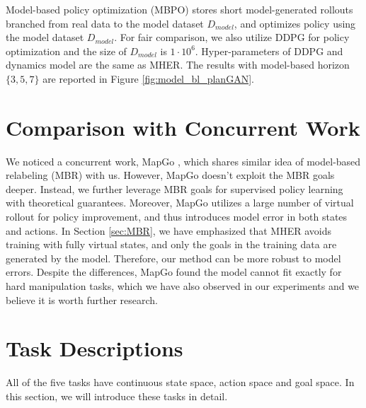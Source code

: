 \documentclass{article}
\begin{document}
Model-based policy optimization (MBPO) \cite{DBLP:conf/nips/JannerFZL19} stores short model-generated rollouts branched from real data to the model dataset $D_{model}$, and optimizes policy using the model dataset $D_{model}$. For fair comparison, we also utilize DDPG for policy optimization and the size of $D_{model}$ is $1\cdot 10^6$. Hyper-parameters of DDPG and dynamics model are the same as MHER. The results with model-based horizon $\{3,5,7\}$ are reported in Figure \ref{fig:model_bl_planGAN}.


\section{Comparison with Concurrent Work}
We noticed a concurrent work, MapGo \cite{zhu2021mapgo}, which shares similar idea of model-based relabeling (MBR) with us. However, MapGo doesn't exploit the MBR goals deeper. Instead, we further leverage MBR goals for supervised policy learning with theoretical guarantees. Moreover, MapGo utilizes a large number of virtual rollout for policy improvement, and thus introduces model error in both states and actions. In Section \ref{sec:MBR}, we have emphasized that MHER avoids training with fully virtual states, and only the goals in the training data are generated by the model. Therefore, our method can be more robust to model errors. Despite the differences, MapGo found the model cannot fit exactly for hard manipulation tasks, which we have also observed in our experiments and we believe it is worth further research.




\section{Task Descriptions}
\label{ap:task_description}
All of the five tasks have continuous state space, action space and goal space. In this section, we will introduce these tasks in detail.
\end{document}
